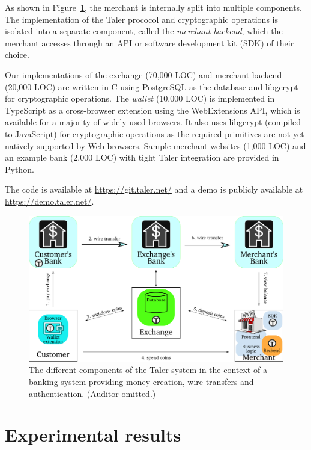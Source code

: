 \documentclass[sigconf, authordraft]{acmart}
\begin{document}
As shown in Figure~\ref{fig:taler-arch}, the merchant is internally split
into multiple components.  The implementation of the Taler prococol and
cryptographic operations is isolated into a separate component, called
the \emph{merchant backend}, which the merchant accesses through an API
or software development kit (SDK) of their choice.

Our implementations of the exchange (70,000 LOC) and merchant backend
(20,000 LOC) are written in C using PostgreSQL as the database and
libgcrypt for cryptographic operations.  The \emph{wallet} (10,000
LOC) is implemented in TypeScript as a cross-browser extension using
the WebExtensions API, which is available for a majority of widely
used browsers.  It also uses libgcrypt (compiled to JavaScript) for
cryptographic operations as the required primitives are not yet
natively supported by Web browsers.  Sample merchant websites (1,000
LOC) and an example bank (2,000 LOC) with tight Taler integration are
provided in Python.

The code is available at \url{https://git.taler.net/} and a demo
is publicly available at \url{https://demo.taler.net/}.


\begin{figure}
  \includegraphics[width=\columnwidth]{taler-arch-full.pdf}
  \caption{The different components of the Taler system in the
    context of a banking system providing money creation,
    wire transfers and authentication. (Auditor omitted.)}
  \label{fig:taler-arch}
\end{figure}


\section{Experimental results}
\end{document}
